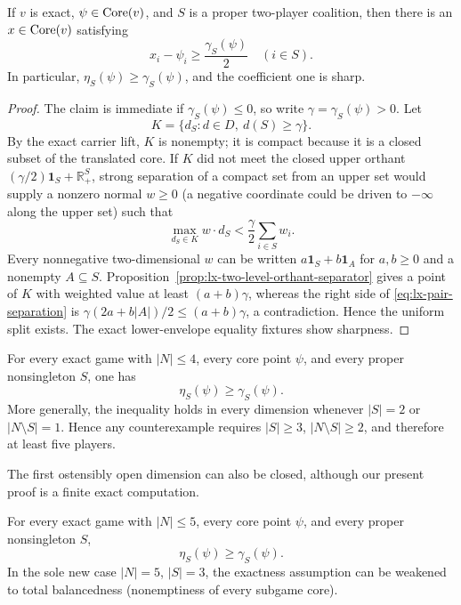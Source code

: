 \begin{proposition}
\label{prop:lx-quantitative-pair}
If $v$ is exact, $\psi\in\operatorname{Core}(v)$, and $S$ is a proper two-player
coalition, then there is an $x\in\operatorname{Core}(v)$ satisfying
\[
 x_i-\psi_i\geq\frac{\gamma_S(\psi)}2\quad(i\in S).
\]
In particular, $\eta_S(\psi)\geq\gamma_S(\psi)$, and the coefficient one
is sharp.
\end{proposition}

\begin{proof}
The claim is immediate if $\gamma_S(\psi)\leq0$, so write
$\gamma=\gamma_S(\psi)>0$.  Let
\[
 K=\{d_S:d\in D,\ d(S)\geq\gamma\}.
\]
By the exact carrier lift, $K$ is nonempty; it is compact because it is a
closed subset of the translated core.  If $K$ did not meet the closed upper
orthant $(\gamma/2)\mathbf1_S+\mathbb R^S_+$, strong separation of a compact
set from an upper set would supply a nonzero normal $w\geq0$ (a negative
coordinate could be driven to $-\infty$ along the upper set) such that
\[
 \max_{d_S\in K}w\cdot d_S
 <\frac\gamma2\sum_{i\in S}w_i.
 \tag{PS}\label{eq:lx-pair-separation}
\]
Every nonnegative two-dimensional $w$ can be written
$a\mathbf1_S+b\mathbf1_A$ for $a,b\geq0$ and a nonempty $A\subseteq S$.
Proposition~\ref{prop:lx-two-level-orthant-separator} gives a point of $K$
with weighted value at least $(a+b)\gamma$, whereas the right side of
\eqref{eq:lx-pair-separation} is
$\gamma(2a+b|A|)/2\leq(a+b)\gamma$, a contradiction.  Hence the uniform
split exists.  The exact lower-envelope equality fixtures show sharpness.
\end{proof}

\begin{corollary}
\label{cor:lx-quantitative-through-four}
For every exact game with $|N|\leq4$, every core point $\psi$, and every
proper nonsingleton $S$, one has
\[
 \eta_S(\psi)\geq\gamma_S(\psi).
\]
More generally, the inequality holds in every dimension whenever
$|S|=2$ or $|N\setminus S|=1$.  Hence any counterexample requires
$|S|\geq3$, $|N\setminus S|\geq2$, and therefore at least five players.
\end{corollary}

The first ostensibly open dimension can also be closed, although our present
proof is a finite exact computation.

\begin{proposition}
\label{prop:lx-quantitative-through-five}
For every exact game with $|N|\leq5$, every core point $\psi$, and every
proper nonsingleton $S$,
\[
 \eta_S(\psi)\geq\gamma_S(\psi).
\]
In the sole new case $|N|=5$, $|S|=3$, the exactness assumption can be
weakened to total balancedness (nonemptiness of every subgame core).
\end{proposition}

